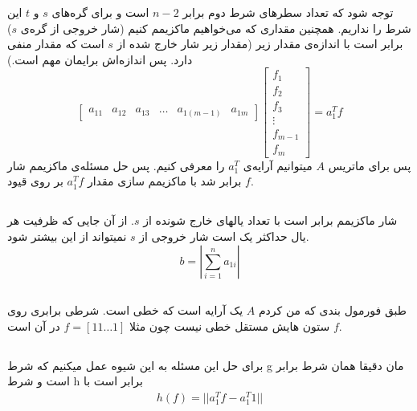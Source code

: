 \documentclass[a4paper]{article}
\begin{document}
توجه شود که تعداد سطر‌های شرط دوم برابر $ n-2 $ است و برای گره‌های $ s $ و $ t $ این شرط را نداریم.
همچنین مقداری که می‌خواهیم ماکزیمم کنیم (شار خروجی از گره‌ی $ s $) برابر است با  اندازه‌ی مقدار زیر (مقدار زیر شار خارج شده از $ s $ است که مقدار منفی دارد. پس اندازه‌اش برایمان مهم است.)   
\begin{equation*}
	\begin{bmatrix}
		a_{11} & a_{12} & a_{13} & \dots & a_{1(m-1)} & a_{1m} 
	\end{bmatrix}
	\begin{bmatrix}
		f_{1} \\
		f_{2} \\
		f_{3} \\
		\vdots \\
		f_{m-1} \\
		f_{m} 
	\end{bmatrix} = a_{1}^{T} f
\end{equation*}
پس برای ماتریس $ A $ میتوانیم آرایه‌ی $ a_{1}^{T} $ را معرفی کنیم. پس حل مسئله‌ی ماکزیمم شار برابر شد با ماکزیمم سازی مقدار 
$ a_{1}^{T} f $ 
بر روی قیود $ f $.
\subsection{}
شار ماکزیمم برابر است با تعداد یالهای خارج شونده از $ s $. از آن جایی که ظرفیت هر یال حداکثر یک است شار خروجی از  $ s $ نمیتواند از این بیشتر شود. 
\begin{equation*}
	b = | \sum_{i=1}^{n} a_{1i} |
\end{equation*}
\subsection{}
طبق فورمول بندی که من کردم $ A $ یک آرایه است که خطی است. شرطی برابری روی $ f $   ستون هایش مستقل خطی نیست چون مثلا
 $ f = [1 1 \dots 1] $
 در 
 آن است.
\subsection{}
برای حل این مسئله به این شیوه عمل میکنیم که شرط g مان دقیقا همان شرط برابر است و شرط h برابر است با
\begin{gather*}
	h(f) = || a_{1}^{T}f - a_{1}^{T} 1 || 
\end{gather*}
\subsection{}
\subsection{}
\newpage
\end{document}
